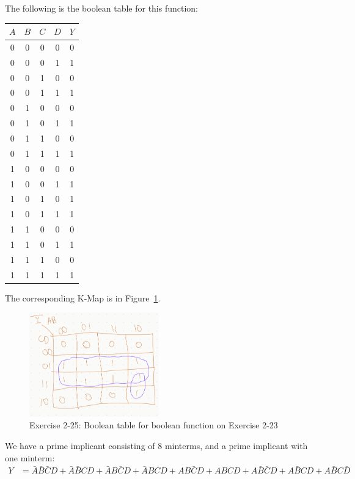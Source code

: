 \documentclass[12pt]{article}
\newenvironment{sol}[1][Solution]{\begin{trivlist}
		\item[\hskip \labelsep {\bfseries #1:}]}{\end{trivlist}}
\begin{document}
\begin{sol}
	The following is the boolean table for this function:
	\begin{center}
		\begin{tabular}{cccc|c}
			$A$ & $B$ & $C$ & $D$ & $Y$\\
			\hline
			0 & 0 & 0 & 0 & 0\\
			0 & 0 & 0 & 1 & 1\\
			0 & 0 & 1 & 0 & 0\\
			0 & 0 & 1 & 1 & 1\\
			0 & 1 & 0 & 0 & 0\\
			0 & 1 & 0 & 1 & 1\\
			0 & 1 & 1 & 0 & 0\\
			0 & 1 & 1 & 1 & 1\\
			1 & 0 & 0 & 0 & 0\\
			1 & 0 & 0 & 1 & 1\\
			1 & 0 & 1 & 0 & 1\\
			1 & 0 & 1 & 1 & 1\\
			1 & 1 & 0 & 0 & 0\\
			1 & 1 & 0 & 1 & 1\\
			1 & 1 & 1 & 0 & 0\\
			1 & 1 & 1 & 1 & 1\\
		\end{tabular}
	\end{center}
	The corresponding K-Map is in Figure~\ref{02-25-kmap}.
	\begin{figure}
		\centering
		\includegraphics[width=0.5\textwidth]{02-25-kmap}
		\caption{Exercise 2-25: Boolean table for boolean function on
			Exercise 2-23}
		\label{02-25-kmap}
	\end{figure}
	We have a prime implicant consisting of 8 minterms, and a
	prime implicant with one minterm:
	\begin{align*}
		Y&=\bar{A}\bar{B}\bar{C}D+\bar{A}\bar{B}CD
		+\bar{A}B\bar{C}D+\bar{A}BCD+AB\bar{C}D+ABCD
		+A\bar{B}\bar{C}D+A\bar{B}CD
		+A\bar{B}C\bar{D}\\

\end{align*}
\end{sol}
\end{document}
